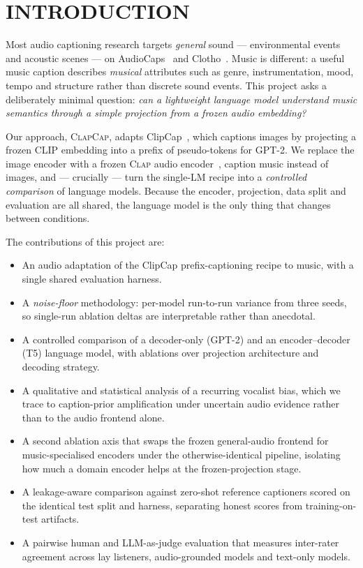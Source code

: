 \documentclass[9pt]{report}
\newcommand{\clapenc}{\textsc{Clap}}
\newcommand{\sys}{\textsc{ClapCap}}
\begin{document}
{\hypersetup{linkcolor=black}
\tableofcontents
}
\newpage

\chapter{INTRODUCTION}

Most audio captioning research targets \emph{general} sound --- environmental events and
acoustic scenes --- on AudioCaps~\cite{kim2019audiocaps} and Clotho~\cite{drossos2020clotho}.
Music is different: a useful music caption describes \emph{musical} attributes such as genre,
instrumentation, mood, tempo and structure rather than discrete sound events. This project asks
a deliberately minimal question: \emph{can a lightweight language model understand music
semantics through a simple projection from a frozen audio embedding?}

Our approach, \sys{}, adapts ClipCap~\cite{mokady2021clipcap}, which captions images by
projecting a frozen CLIP embedding into a prefix of pseudo-tokens for GPT-2. We replace the image
encoder with a frozen \clapenc{} audio encoder~\cite{wu2023clap}, caption music instead of
images, and --- crucially --- turn the single-LM recipe into a \emph{controlled comparison} of
language models. Because the encoder, projection, data split and evaluation are all shared, the
language model is the only thing that changes between conditions.

The contributions of this project are:
\begin{itemize}\itemsep2pt
  \item An audio adaptation of the ClipCap prefix-captioning recipe to music, with a single
        shared evaluation harness.
  \item A \emph{noise-floor} methodology: per-model run-to-run variance from three seeds, so
        single-run ablation deltas are interpretable rather than anecdotal.
  \item A controlled comparison of a decoder-only (GPT-2) and an encoder--decoder (T5) language
        model, with ablations over projection architecture and decoding strategy.
  \item A qualitative and statistical analysis of a recurring vocalist bias, which we trace to
        caption-prior amplification under uncertain audio evidence rather than to the audio
        frontend alone.
  \item A second ablation axis that swaps the frozen general-audio frontend for
        music-specialised encoders under the otherwise-identical pipeline, isolating how much a
        domain encoder helps at the frozen-projection stage.
  \item A leakage-aware comparison against zero-shot reference captioners scored on the identical
        test split and harness, separating honest scores from training-on-test artifacts.
  \item A pairwise human and LLM-as-judge evaluation that measures inter-rater agreement across
        lay listeners, audio-grounded models and text-only models.
\end{itemize}
\end{document}
